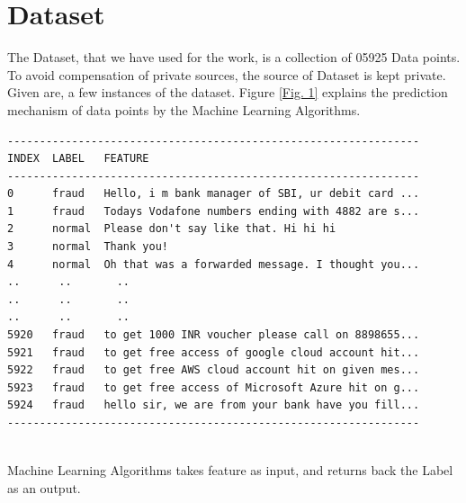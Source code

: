 \documentclass[sn-basic]{sn-jnl}%
\theoremstyle{thmstyleone}%
\theoremstyle{thmstyletwo}%
\theoremstyle{thmstylethree}%
\begin{document}
\section{Dataset}
The Dataset, that we have used for the work, is a collection of 05925 Data points. To avoid compensation of private sources, the source of Dataset is kept private. Given are, a few instances of the dataset. Figure \ref{Fig. 1} explains the prediction mechanism of data points by the Machine Learning Algorithms. \\
\begin{verbatim}
----------------------------------------------------------------
INDEX  LABEL   FEATURE
----------------------------------------------------------------
0      fraud   Hello, i m bank manager of SBI, ur debit card ...
1      fraud   Todays Vodafone numbers ending with 4882 are s...
2      normal  Please don't say like that. Hi hi hi
3      normal  Thank you!
4      normal  Oh that was a forwarded message. I thought you...
..      ..       ..
..      ..       ..
..      ..       ..
5920   fraud   to get 1000 INR voucher please call on 8898655...
5921   fraud   to get free access of google cloud account hit...
5922   fraud   to get free AWS cloud account hit on given mes...
5923   fraud   to get free access of Microsoft Azure hit on g...
5924   fraud   hello sir, we are from your bank have you fill...
----------------------------------------------------------------
\end{verbatim}
\textbf{\\}Machine Learning Algorithms takes feature as input, and returns back the Label as an output. 
\end{document}
